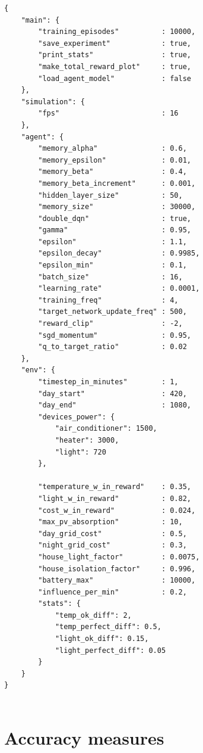 \documentclass{article}
\begin{document}
\begin{lstlisting}
{
    "main": {
        "training_episodes"          : 10000,
        "save_experiment"            : true,
        "print_stats"                : true,
        "make_total_reward_plot"     : true,
        "load_agent_model"           : false
    },
    "simulation": {
        "fps"                        : 16
    },
    "agent": {
        "memory_alpha"               : 0.6,
        "memory_epsilon"             : 0.01,
        "memory_beta"                : 0.4,
        "memory_beta_increment"      : 0.001,
        "hidden_layer_size"          : 50,
        "memory_size"                : 30000,
        "double_dqn"                 : true,
        "gamma"                      : 0.95,
        "epsilon"                    : 1.1,
        "epsilon_decay"              : 0.9985,
        "epsilon_min"                : 0.1,
        "batch_size"                 : 16,
        "learning_rate"              : 0.0001,
        "training_freq"              : 4,
        "target_network_update_freq" : 500,
        "reward_clip"                : -2,
        "sgd_momentum"               : 0.95,
        "q_to_target_ratio"          : 0.02
    },
    "env": {
        "timestep_in_minutes"        : 1,
        "day_start"                  : 420,
        "day_end"                    : 1080,
        "devices_power": {
            "air_conditioner": 1500,
            "heater": 3000,
            "light": 720
        },

        "temperature_w_in_reward"    : 0.35,
        "light_w_in_reward"          : 0.82,
        "cost_w_in_reward"           : 0.024,
        "max_pv_absorption"          : 10,
        "day_grid_cost"              : 0.5,
        "night_grid_cost"            : 0.3,
        "house_light_factor"         : 0.0075,
        "house_isolation_factor"     : 0.996,
        "battery_max"                : 10000,
        "influence_per_min"          : 0.2,
        "stats": {
            "temp_ok_diff": 2,
            "temp_perfect_diff": 0.5,
            "light_ok_diff": 0.15,
            "light_perfect_diff": 0.05
        }
    }
}


\end{lstlisting}

\section{Accuracy measures}
\end{document}

